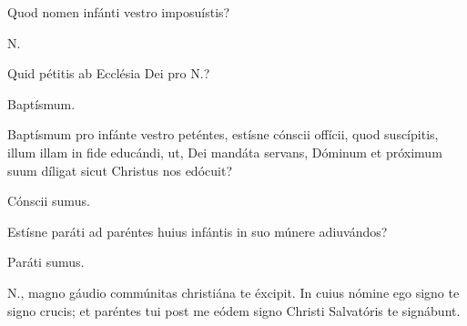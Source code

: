 
Quod nomen infánti vestro imposuístis?

 {\color{red}N.}

 Quid pétitis ab Ecclésia Dei pro {\color{red}N.}?

 Baptísmum.

 Baptísmum pro infánte vestro peténtes,
estísne cónscii offícii, quod suscípitis,
\ifparvulus
illum
\else
illam
\fi
in fide educándi, ut, Dei
mandáta servans, Dóminum et próximum suum díligat sicut Christus nos
edócuit?

 Cónscii sumus.

 Estísne paráti ad paréntes huius infántis in suo múnere
adiuvándos?

 Paráti sumus.

 {\color{red}N.}, magno gáudio commúnitas
christiána te éxcipit. In cuius nómine ego signo te signo crucis; et paréntes
tui post me eódem signo Christi Salvatóris te signábunt.

